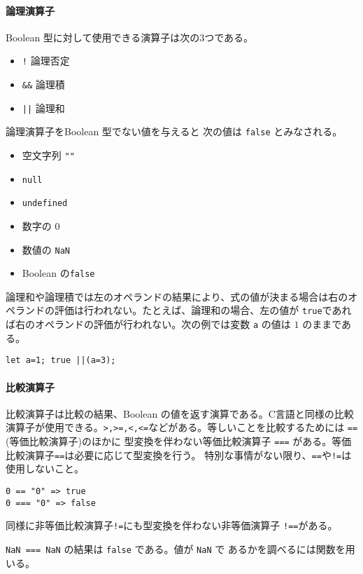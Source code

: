 \paragraph{論理演算子}
Boolean 型に対して使用できる演算子は次の3つである。
\begin{itemize}
 \item \Verb+!+ 論理否定
 \item \Verb+&&+ 論理積
 \item \Verb+||+ 論理和
\end{itemize}
論理演算子をBoolean 型でない値を与えると
次の値は \Verb+false+ とみなされる。
\begin{itemize}
 \item 空文字列 \Verb+""+
 \item \Verb+null+
 \item \Verb+undefined+
 \item 数字の $0$
 \item 数値の \Verb+NaN+
 \item Boolean の\Verb+false+
\end{itemize}
論理和や論理積では左のオペランドの結果により、式の値が決まる場合は右のオ
ペランドの評価は行われない。たとえば、論理和の場合、左の値が
\Verb+true+であれば右のオペランドの評価が行われない。次の例では変数
\Verb+a+ の値は $1$ のままである。 
\begin{Verbatim}
let a=1; true ||(a=3); 
\end{Verbatim}
\paragraph%
{比較演算子}
比較演算子は比較の結果、Boolean の値を返す演算である。C言語と同様の比較
演算子が使用できる。\texttt{>,>=,<,<=}などがある。等しいことを比較するためには
\Verb+==+(等価比較演算子)のほかに 型変換を伴わない等価比較演算子
\Verb+===+ がある。等価比較演算子\texttt{==}は必要に応じて型変換を行う。
特別な事情がない限り、\Verb+==+や\Verb+!=+は使用しないこと。
\begin{Verbatim}
0 == "0" => true
0 === "0" => false
\end{Verbatim}
同様に非等価比較演算子\texttt{!=}にも型変換を伴わない非等価演算子
\texttt{!==}がある。

\Verb+NaN === NaN+ の結果は \Verb+false+ である。値が \Verb+NaN+ で
あるかを調べるには関数を用いる。
